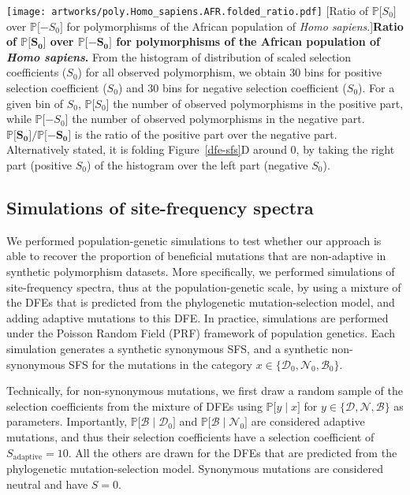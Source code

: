 \documentclass{article}
\newcommand{\proba}{\mathbb{P}}
\newcommand{\Sphy}{S_{0}}
\newcommand{\SphyDel}{\mathcal{D}_0}
\newcommand{\SphyNeu}{\mathcal{N}_0}
\newcommand{\SphyBen}{\mathcal{B}_0}
\newcommand{\given}{\mid}
\newcommand{\SpopDel}{\mathcal{D}}
\newcommand{\SpopNeu}{\mathcal{N}}
\newcommand{\SpopBen}{\mathcal{B}}
\begin{document}
    \begin{center}
        \texttt{[image: artworks/poly.Homo\_sapiens.AFR.folded\_ratio.pdf]}
        [Ratio of $\proba{[}\Sphy{]}$ over $\proba{[}-\Sphy{]}$ for polymorphisms of the African population of \textit{Homo sapiens}.]{\textbf{Ratio of $\bm{\proba{[}\Sphy{]}}$ over $\bm{\proba{[}-\Sphy{]}}$ for polymorphisms of the African population of \textit{Homo sapiens}.}
        From the histogram of distribution of scaled selection coefficients ($\Sphy$) for all observed polymorphism, we obtain 30 bins for positive selection coefficient ($\Sphy$) and 30 bins for negative selection coefficient ($\Sphy$). For a given bin of $\Sphy$, $\proba{[}\Sphy{]}$ the number of observed polymorphisms in the positive part, while $\proba{[}-\Sphy{]}$ the number of observed polymorphisms in the negative part. $\bm{\proba{[}\Sphy{]} / \proba{[}-\Sphy{]}}$ is the ratio of the positive part over the negative part. Alternatively stated, it is folding Figure~\ref{dfe-sfs}D around 0, by taking the right part (positive $\Sphy$) of the histogram over the left part (negative $\Sphy$).
        }
        \label{mispol-expectation}
    \end{center}

    \newpage
    \subsection{Simulations of site-frequency spectra}

    We performed population-genetic simulations to test whether our approach is able to recover the proportion of beneficial mutations that are non-adaptive in synthetic polymorphism datasets.
    More specifically, we performed simulations of site-frequency spectra, thus at the population-genetic scale, by using a mixture of the DFEs that is predicted from the phylogenetic mutation-selection model, and adding adaptive mutations to this DFE.
    In practice, simulations are performed under the Poisson Random Field (PRF) framework of population genetics\cite{sawyer_population_1992}.
    Each simulation generates a synthetic synonymous SFS, and a synthetic non-synonymous SFS for the mutations in the category $x \in \{ \SphyDel, \SphyNeu, \SphyBen \}$.

    Technically, for non-synonymous mutations, we first draw a random sample of the selection coefficients from the mixture of DFEs using $\proba{[}y \given x{]}$ for $y \in \{ \SpopDel, \SpopNeu, \SpopBen \}$ as parameters.
    Importantly, $\proba{[}\SpopBen \given \SphyDel{]}$ and $\proba{[}\SpopBen \given \SphyNeu{]}$ are considered adaptive mutations, and thus their selection coefficients have a selection coefficient of $S_{\text{adaptive}}=10$.
    All the others are drawn for the DFEs that are predicted from the phylogenetic mutation-selection model.
    Synonymous mutations are considered neutral and have $S=0$.
\end{document}
